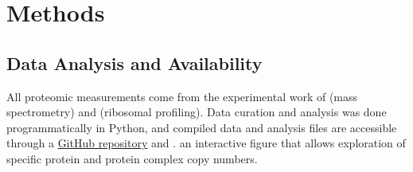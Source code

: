 \section{Methods}

\subsection{Data Analysis and Availability}
All proteomic measurements come from the experimental work of \cite{schmidt2016, peebo2015, valgepea2013} (mass spectrometry) and \cite{li2014} (ribosomal profiling).
Data curation and analysis was done programmatically in Python, and compiled data
 and analysis files are accessible
through a \href{https://github.com/RPGroup-PBoC/growth_limits}{GitHub
repository} and . an interactive figure that allows exploration of specific
protein and protein complex copy numbers.


